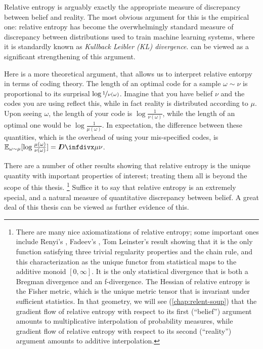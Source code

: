 Relative entropy is arguably exactly the appropriate measure of discrepancy between belief and reality. 
The most obvious argument for this is the empirical one:
relative entropy has become the overwhelmingly standard measure of discrepancy between distributions used to train machine learning systems, where it is standardly known as \emph{Kullback Leibler (KL) divergence}.
 can be viewed as a significant strengthening of this argument.


Here is a more theoretical argument, that allows us to interpret relative entorpy in terms of coding theory. 
The length of an optimal code for a sample $\omega \sim \nu$ is proportional to its surprisal $\log \nicefrac1{\nu(\omega)}$.
Imagine that you have belief $\nu$ and the codes you are using reflect this, while in fact reality is distributed according to $\mu$.
Upon seeing $\omega$, the length of your code is $\log\frac{1}{\nu(\omega)}$, while the length of an optimal one would be $\log\frac{1}{\mu(\omega)}$. 
In expectation, the difference between these quantities,
    which is the overhead of using your mis-specified codes, is 
     $\Ex_{\omega \sim \mu}[ \log \frac{\mu(\omega)}{\nu(\omega)}] = \kldiv\mu\nu$.


There are a number of other results showing that relative entropy is the unique quantity with important properties of interest; treating them all is beyond the scope of this thesis.%
\footnote{%
There are many nice axiomatizations of relative entropy;
some important ones include Renyi's \citep{renyi1961measures}, Fadeev's \citep{fadeev1957begriff}, Tom Leinster's result showing
that it is the only function satisfying three trivial regularity
properties and the chain rule, and this characterization as the unique
functor from statistical maps to the additive monoid $[0,\infty]$.  It is the
only statistical divergence that is both a Bregman divergence and an
f-divergence.  The Hessian of relative entropy is the Fisher metric, 
which is the unique metric tensor that is invariant under sufficient statistics. 
In that geometry, we will see (\cref{chap:relent-soup}) that the gradient flow of relative entropy
with respect to its first (``belief'') argument amounts to
multiplicative interpolation of probability measures, while gradient
flow of relative entropy with respect to its second (``reality'')
argument amounts to additive interpolation. 
}
%
Suffice it to say that relative entropy is an extremely special,
    and a natural measure of quantitative discrepancy between belief. 
A great deal of this thesis can be viewed as further evidence of this. 
    
